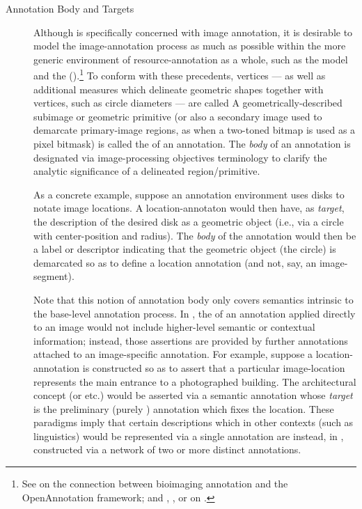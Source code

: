 {\begin{description}
\item[Annotation Body and Targets]  Although 
\AXFI{} is specifically concerned with 
image annotation, it is desirable to model 
the image-annotation process as much as possible 
within the more generic environment of 
resource-annotation as a whole, such 
as the  model and the 
(\LAF{}).\footnote{See  on the connection between bioimaging 
annotation and the OpenAnnotation framework; 
and , , or  on \sLAF{}.}  To conform with 
these precedents, \AXFI{} vertices --- as well 
as additional measures which delineate geometric 
shapes together with vertices, such as circle 
diameters --- are called   A 
geometrically-described subimage or geometric primitive 
(or also a secondary image used to demarcate 
primary-image regions, as when a two-toned bitmap 
is used as a pixel bitmask) is called 
the  of an annotation.  The \textit{body} 
of an annotation is designated via 
image-processing objectives terminology to 
clarify the analytic significance of a 
delineated region/primitive.

As a concrete example, suppose an annotation environment 
uses disks to notate image locations.  A location-annotaton 
would then have, as \textit{target}, the description 
of the desired disk as a geometric object (i.e., 
via a circle with center-position and radius).  
The \textit{body} of the annotation would then 
be a label or descriptor indicating that the 
geometric object (the circle) is demarcated 
so as to define a location annotation (and not, 
say, an image-segment).

Note that this notion of annotation body only 
covers semantics intrinsic to the base-level 
annotation process.  In \AXFI{}, the  
of an annotation applied directly to an 
image would not include higher-level semantic 
or contextual information; instead, those 
assertions are provided by further annotations 
attached to an image-specific annotation.  For 
example, suppose a location-annotation is 
constructed so as to assert that a particular 
image-location represents the main entrance to 
a photographed building.  The architectural 
concept  (or  etc.) 
would be asserted via a semantic annotation 
whose \textit{target} is the preliminary 
(purely ) annotation which fixes 
the location.  These paradigms imply that certain 
descriptions which in other contexts (such 
as linguistics) would be represented via 
a single annotation are instead, in \AXFI{}, 
constructed via a network of two or 
more distinct annotations.


\end{description}}
